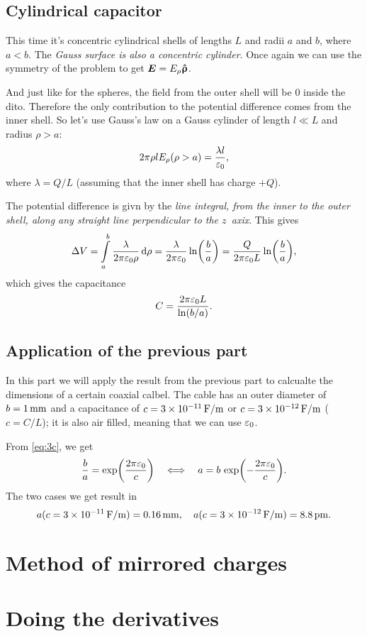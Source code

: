 \documentclass[11pt,letter, swedish, english
]{article}
\let\oldint\int
\renewcommand{\int}{\oldint\limits}
\newcommand{\enaught}{\ensuremath\varepsilon_0}
\begin{document}
\subsection{Cylindrical capacitor}
This time it's concentric cylindrical shells of lengths $L$ and radii
$a$ and $b$, where $a<b$. The \textit{Gauss surface is also a
  concentric cylinder}. Once again we can use the symmetry of the
problem to get $\vb*E=E_\rho\vu*\uprho$.

And just like for the spheres, the field from the outer shell will be
$0$ inside the dito. Therefore the only contribution to the potential
difference comes from the inner shell. So let's use Gauss's law on a
Gauss cylinder of length $l\ll L$ and radius $\rho>a$:
\begin{equation}
2\pi\rho l E_\rho(\rho>a)=\frac{\lambda l}{\enaught},
\end{equation}
where $\lambda=Q/L$ (assuming that the inner shell has charge $+Q$).

The potential difference is givn by the \textit{line integral, from the
inner to the outer shell, along any straight line perpendicular to the
$z$~axix}. This gives
\begin{equation}
\Delta{V}=\int_a^b\frac{\lambda}{2\pi\enaught \rho}\id\rho
=\frac{\lambda}{2\pi\enaught}\ln(\frac{b}{a})
=\frac{Q}{2\pi\enaught L}\ln(\frac{b}{a}),
\end{equation}
which gives the capacitance
\begin{equation}\label{eq:3c}
C=\frac{2\pi\enaught L}{\ln(b/a)}.
\end{equation}


\subsection{Application of the previous part}
In this part we will apply the result from the previous part to
calcualte the dimensions of a certain coaxial calbel. The cable has an
outer diameter of $b=\unit[1]{mm}$ and a capacitance of
$c=\unit[3\times10^{-11}]{F/m}$ or $c=\unit[3\times10^{-12}]{F/m}$
($c=C/L$); it is also air filled, meaning that we can use $\enaught$.

From \eqref{eq:3c}, we get
\begin{equation}
\frac{b}{a}=\exp(\frac{2\pi\enaught}{c})
\quad\Longleftrightarrow\quad
a=b\,\exp(-\frac{2\pi\enaught}{c}).
\end{equation}
The two cases we get result in
\begin{equation}
a(c=\unit[3\times10^{-11}]{F/m})=\unit[0.16]{mm}\qcomma
a(c=\unit[3\times10^{-12}]{F/m})=\unit[8.8]{pm}.
\end{equation}





\section{Method of mirrored charges}


\section{Doing the derivatives}
\end{document}
